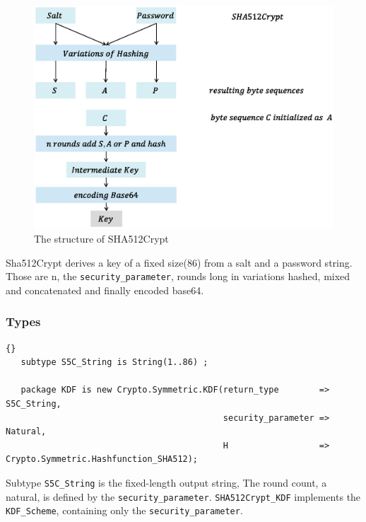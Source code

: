 \begin{figure}[ht!]
\centering
\includegraphics[width=150mm]{./images/SHA512Crypt}
\caption{The structure of SHA512Crypt}
\end{figure}

Sha512Crypt derives a key of a fixed size(86) from a salt and a password string. Those are n, the \texttt{security\_parameter}, rounds long in variations hashed, mixed and concatenated and finally encoded base64.
\subsubsection*{Types}
\begin{lstlisting}{}
   subtype S5C_String is String(1..86) ;

   package KDF is new Crypto.Symmetric.KDF(return_type        => S5C_String,
                                           security_parameter => Natural,
                                           H                  => Crypto.Symmetric.Hashfunction_SHA512);

\end{lstlisting}
Subtype \texttt{S5C\_String} is the fixed-length output string, The round count, a natural, is defined by the \texttt{security\_parameter}. \texttt{SHA512Crypt\_KDF} implements the \texttt{KDF\_Scheme}, containing only the \texttt{security\_parameter}. 

